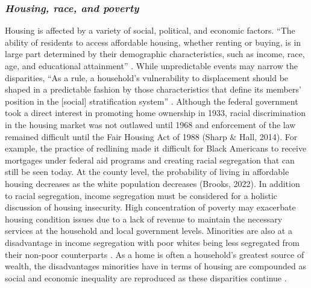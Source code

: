 \subsubsection{\textit{Housing, race, and poverty}}
Housing is affected by a variety of social, political, and economic factors. “The ability of residents to access affordable housing, whether renting or buying, is in large part determined by their demographic characteristics, such as income, race, age, and educational attainment” \citep[115]{yadavalli_comprehensive_2020}. While unpredictable events may narrow the disparities, “As a rule, a household’s vulnerability to displacement should be shaped in a predictable fashion by those characteristics that define its members’ position in the [social] stratification system” \citep[5]{lee_forced_2020}. Although the federal government took a direct interest in promoting home ownership in 1933, racial discrimination in the housing market was not outlawed until 1968 and enforcement of the law remained difficult until the Fair Housing Act of 1988 (Sharp \& Hall, 2014). For example, the practice of redlining made it difficult for Black Americans to receive mortgages under federal aid programs and creating racial segregation that can still be seen today. At the county level, the probability of living in affordable housing decreases as the white population decreases (Brooks, 2022). In addition to racial segregation, income segregation must be considered for a holistic discussion of housing insecurity. High concentration of poverty may exacerbate housing condition issues due to a lack of revenue to maintain the necessary services at the household and local government levels. Minorities are also at a disadvantage in income segregation with poor whites being less segregated from their non-poor counterparts \citep{lichter_ruralurban_2021}. As a home is often a household's greatest source of wealth, the disadvantages minorities have in terms of housing are compounded as social and economic inequality are reproduced as these disparities continue \citep{krivo_housing_2004}.  



